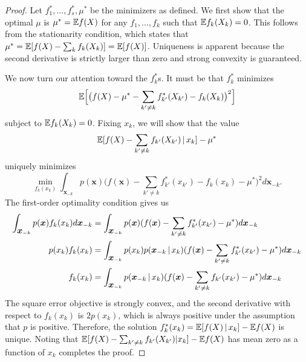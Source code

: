 \begin{proof}
  Let $f^*_1,...,f^*_s, \mu^*$ be the minimizers as defined.  We first
  show that the optimal $\mu$ is $\mu^* = {\mathbb E} f(X)$ for any $f_1, ...,
  f_k$ such that ${\mathbb E} f_k(X_k) = 0$. This follows from the stationarity
  condition, which states that $\mu^* = {\mathbb E}[ f(X) - \sum_k f_k(X_k)] =
  {\mathbb E}[ f(X) ]$. Uniqueness is apparent because the second derivative is
  strictly larger than zero and strong convexity is guaranteed.

  We now turn our attention toward the $f^*_k$s.  It must be that
  $f^*_k$ minimizes 
\begin{equation}
{\mathbb E}\Bigl[ \big( f(X) - \mu^* - \sum_{k' \neq k}
  f^*_{k'} (X_{k'}) - f_k (X_k) \big)^2\Bigr]
\end{equation}
subject to ${\mathbb E} f_k(X_k) = 0$.
Fixing $x_k$, we will show that the value 
\begin{equation}
{\mathbb E}[ f(X) - \sum_{k' \neq k}
f_{k'}(X_{k'}) {\,|\,} x_k] - \mu^*
\end{equation} 
uniquely minimizes
\begin{equation}
\min_{ f_k(x_k) } \int_{\mathbf{x}_{-k}} p(\mathbf{x}) 
         \Big( f(\mathbf{x}) - \sum_{k' \neq k} f^*_{k'} (x_{k'}) - f_k (x_k) -\mu^*\Big)^2 
                 d \mathbf{x}_{-k}.
\end{equation}
The first-order optimality condition gives us
\begin{align}
\int_{\mbox{\boldmath $x$}_{-k}} p(\mbox{\boldmath $x$}) f_k(x_k) d \mbox{\boldmath $x$}_{-k} &= 
  \int_{\mbox{\boldmath $x$}_{-k}} p(\mbox{\boldmath $x$}) 
      ( f(\mbox{\boldmath $x$})-\sum_{k' \neq k} f^*_{k'}(x_{k'})-\mu^*) d \mbox{\boldmath $x$}_{-k} \\  
p(x_k) f_k(x_k) &= \int_{\mbox{\boldmath $x$}_{-k}} p(x_k)
     p(\mbox{\boldmath $x$}_{-k} {\,|\,} x_k ) 
     ( f(\mbox{\boldmath $x$}) - \sum_{k' \neq k} f^*_{k'} (x_{k'})-\mu^*) 
              d \mbox{\boldmath $x$}_{-k} \\
f_k(x_k) &= \int_{\mbox{\boldmath $x$}_{-k}} 
       p(\mbox{\boldmath $x$}_{-k} {\,|\,} x_k ) 
     (f(\mbox{\boldmath $x$}) - \sum_{k'\neq k} f_{k'} (x_{k'})  -\mu^*) d \mbox{\boldmath $x$}_{-k} 
 \end{align}
The square error objective is strongly convex,
and the second derivative with respect to $f_k(x_k)$ is $2 p(x_k)$, which is always positive under the assumption that $p$ is positive. Therefore, the solution $f^*_k(x_k) = {\mathbb E}[ f(X) {\,|\,} x_k ] - {\mathbb E} f(X)$ is unique.
Noting that ${\mathbb E}[ f(X) -\sum_{k'\neq k} f_{k'}(X_{k'}) | x_k] - {\mathbb E} f(X)$ has mean zero as a function of $x_k$
completes the proof.
\end{proof}

